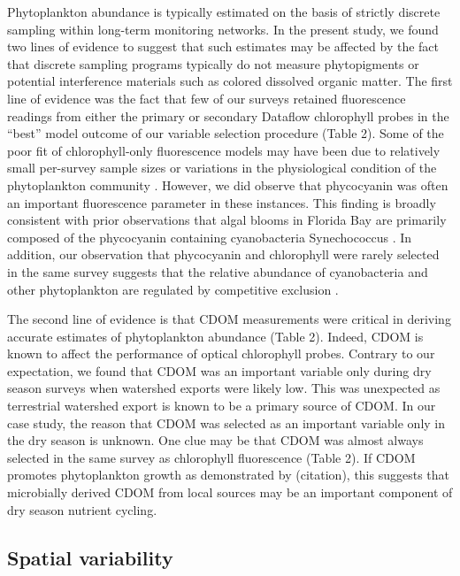\documentclass[review]{elsarticle}
\begin{document}
Phytoplankton abundance is typically estimated on the basis of strictly discrete sampling within long-term monitoring networks. In the present study, we found two lines of evidence to suggest that such estimates may be affected by the fact that discrete sampling programs typically do not measure phytopigments or potential interference materials such as colored dissolved organic matter. The first line of evidence was the fact that few of our surveys retained fluorescence readings from either the primary or secondary Dataflow chlorophyll probes in the “best” model outcome of our variable selection procedure (Table 2). Some of the poor fit of chlorophyll-only fluorescence models may have been due to relatively small per-survey sample sizes or variations in the physiological condition of the phytoplankton community \citep{goldman2013estimation}. However, we did observe that phycocyanin was often an important fluorescence parameter in these instances. This finding is broadly consistent with prior observations that algal blooms in Florida Bay are primarily composed of the phycocyanin containing cyanobacteria Synechococcus . In addition, our observation that phycocyanin and chlorophyll were rarely selected in the same survey suggests that the relative abundance of cyanobacteria and other phytoplankton are regulated by competitive exclusion . 

The second line of evidence is that CDOM measurements were critical in deriving accurate estimates of phytoplankton abundance (Table 2). Indeed, CDOM is known to affect the performance of optical chlorophyll probes. Contrary to our expectation, we found that CDOM was an important variable only during dry season surveys when watershed exports were likely low. This was unexpected as terrestrial watershed export is known to be a primary source of CDOM. In our case study, the reason that CDOM was selected as an important variable only in the dry season is unknown. One clue may be that CDOM was almost always selected in the same survey as chlorophyll fluorescence (Table 2). If CDOM promotes phytoplankton growth as demonstrated by (citation), this suggests that microbially derived CDOM from local sources may be an important component of dry season nutrient cycling.

\subsection{Spatial variability}
\end{document}
